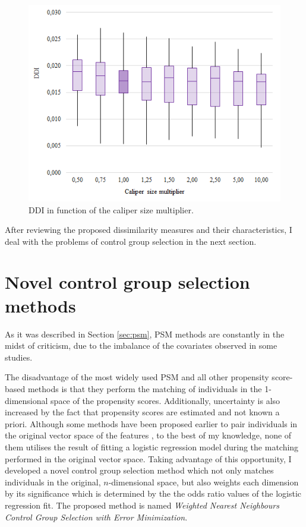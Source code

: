 		\begin{figure}[h]
			\centering
                \captionsetup{justification=centering}
			\includegraphics[width=0.6\linewidth]{assets/figures/control_group_selection/measures/ddi_vs_caliper.png}
                \caption{DDI in function of the caliper size multiplier.}
			\label{fig:ddi_vs_caliper}
		\end{figure}
				  

        After reviewing the proposed dissimilarity measures and their characteristics, I deal with the problems of control group selection in the next section.
								
		\section{Novel control group selection methods}
		\label{sec:methods}
								
		As it was described in Section \ref{sec:psm}, PSM methods are constantly in the midst of criticism, due to the imbalance of the covariates observed in some studies.
								
		The disadvantage of the most widely used PSM and all other propensity score-based methods is that they perform the matching of individuals in the 1-dimensional space of the propensity scores. Additionally, uncertainty is also increased by the fact that propensity scores are estimated and not known a priori. Although some methods have been proposed earlier to pair individuals in the original vector space of the features \cite{cochran1973controlling, rubin1976multivariate, rubin1980bias}, to the best of my knowledge, none of them utilises the result of fitting a logistic regression model during the matching performed in the original vector space. Taking advantage of this opportunity, I developed a novel control group selection method which not only matches individuals in the original, $n$-dimensional space, but also weights each dimension by its significance which is determined by the the odds ratio values of the logistic regression fit. The proposed method is named \textit{Weighted Nearest Neighbours Control Group Selection with Error Minimization}.
								
